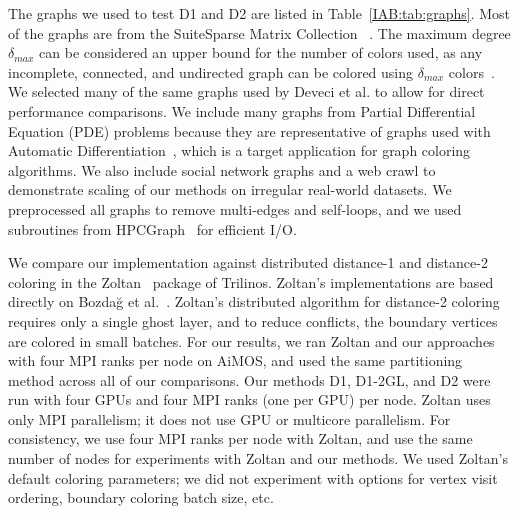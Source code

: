 

The graphs we used to test D1 and D2 are listed in Table~\ref{IAB:tab:graphs}. Most of the graphs are from the SuiteSparse Matrix Collection 
~\cite{IAB:Davis2011UFS}.
The maximum degree $\delta_{max}$ can be considered an upper bound for the number of colors used, as any incomplete, 
connected, and undirected graph can be colored using $\delta_{max}$ colors~\cite{IAB:brooks1941colouring}.
We selected many of the same graphs used by Deveci et al. to allow for direct performance comparisons.
We include many graphs from Partial Differential Equation (PDE) problems because they are representative of graphs used with Automatic Differentiation~\cite{IAB:gebremedhin2020introduction}, which is a target application for graph coloring algorithms.
We also include social network graphs and a web crawl to demonstrate scaling of our methods on irregular real-world datasets.
We preprocessed all graphs to remove multi-edges and self-loops, and 
we used subroutines from HPCGraph~\cite{slota_ipdps2016} for efficient I/O.

We compare our implementation against distributed distance-1 and distance-2 coloring in the Zoltan~\cite{IAB:devine2009getting} package of Trilinos.
Zoltan's implementations are based directly on Bozda{\u{g}} et al.~\cite{IAB:bozdaug2008framework}.
Zoltan's distributed algorithm for distance-2 coloring requires only a single ghost layer, and to reduce conflicts, the boundary vertices are colored in small batches.
For our results, we ran Zoltan and our approaches with four MPI ranks per node on AiMOS, and used the same partitioning method across all of our comparisons.
Our methods D1, D1-2GL, and D2 were run with four GPUs and 
four MPI ranks (one per GPU) per node.
Zoltan uses only MPI parallelism; it does not use GPU or multicore parallelism. 
For consistency, we use four MPI ranks per node with Zoltan, and use the same number of nodes
for experiments with Zoltan and our methods.
We used Zoltan's default coloring parameters; we did not experiment with
options for vertex visit ordering, boundary coloring batch size, etc.

